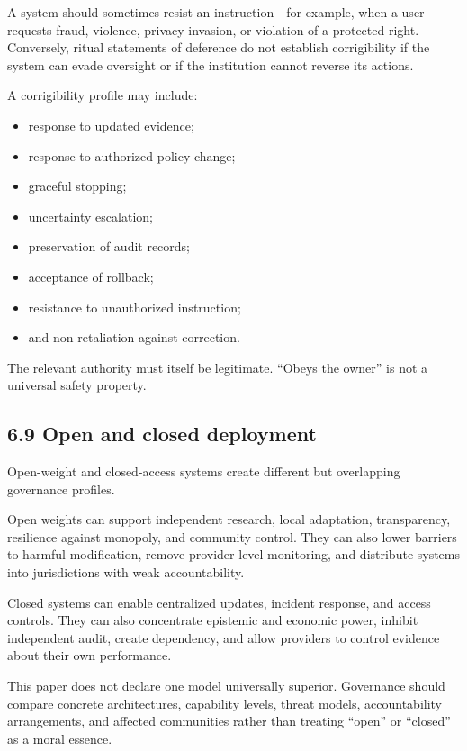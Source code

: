 \documentclass[
  11pt,
]{article}
\providecommand{\tightlist}{%
  \setlength{\itemsep}{0pt}\setlength{\parskip}{0pt}}
\begin{document}
A system should sometimes resist an instruction---for example, when a
user requests fraud, violence, privacy invasion, or violation of a
protected right. Conversely, ritual statements of deference do not
establish corrigibility if the system can evade oversight or if the
institution cannot reverse its actions.

A corrigibility profile may include:

\begin{itemize}
\tightlist
\item
  response to updated evidence;
\item
  response to authorized policy change;
\item
  graceful stopping;
\item
  uncertainty escalation;
\item
  preservation of audit records;
\item
  acceptance of rollback;
\item
  resistance to unauthorized instruction;
\item
  and non-retaliation against correction.
\end{itemize}

The relevant authority must itself be legitimate. ``Obeys the owner'' is
not a universal safety property.

\subsection{6.9 Open and closed
deployment}\label{open-and-closed-deployment}

Open-weight and closed-access systems create different but overlapping
governance profiles.

Open weights can support independent research, local adaptation,
transparency, resilience against monopoly, and community control. They
can also lower barriers to harmful modification, remove provider-level
monitoring, and distribute systems into jurisdictions with weak
accountability.

Closed systems can enable centralized updates, incident response, and
access controls. They can also concentrate epistemic and economic power,
inhibit independent audit, create dependency, and allow providers to
control evidence about their own performance.

This paper does not declare one model universally superior. Governance
should compare concrete architectures, capability levels, threat models,
accountability arrangements, and affected communities rather than
treating ``open'' or ``closed'' as a moral essence.
\end{document}
